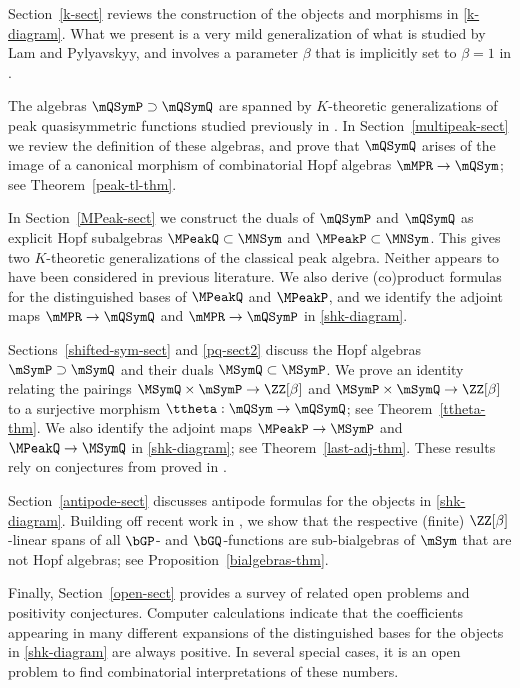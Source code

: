   Section~\ref{k-sect} reviews the construction of the objects and morphisms
in \eqref{k-diagram}. What we present is a very mild generalization of what is studied
by Lam and Pylyavskyy, and involves a parameter $\beta$ that is implicitly set to $\beta=1$ in \cite{LamPyl}.


 The algebras $\mQSymP\supset \mQSymQ$ are spanned by $K$-theoretic generalizations of 
peak quasisymmetric functions studied previously in \cite{LM2019}.
In Section~\ref{multipeak-sect}
we review the definition of these algebras, and prove that $\mQSymQ$ arises of the image of
a canonical morphism of combinatorial Hopf algebras $\mMPR \to \mQSym$; see Theorem~\ref{peak-tl-thm}.

  In Section~\ref{MPeak-sect} we construct the duals of 
$\mQSymP$ and $\mQSymQ$ as   explicit Hopf subalgebras  $\MPeakQ\subset \MNSym$ and $\MPeakP\subset \MNSym$.
This gives two $K$-theoretic generalizations of the classical peak algebra.
Neither appears to have been considered 
in previous literature.
We also derive (co)product formulas for the distinguished bases of 
 $\MPeakQ$ and $\MPeakP$,
 and we identify the adjoint maps $\mMPR \to \mQSymQ$ and $\mMPR \to \mQSymP$ in \eqref{shk-diagram}.
 
  Sections~\ref{shifted-sym-sect} and \ref{pq-sect2}
 discuss the Hopf algebras $\mSymP\supset \mSymQ$
 and their duals $\MSymQ\subset \MSymP$. We 
 prove an identity relating the pairings  $\MSymQ\times \mSymP \to \ZZ[\beta]$
and $\MSymP\times \mSymQ \to \ZZ[\beta]$ to a surjective morphism $\ttheta : \mQSym \to \mQSymQ$;
see Theorem~\ref{ttheta-thm}.
We also identify the adjoint maps $\MPeakP \to \MSymP$
and $\MPeakQ \to \MSymQ$ in \eqref{shk-diagram}; see Theorem~\ref{last-adj-thm}.
These results rely on conjectures from \cite{LM2019,NN2018} proved in \cite{ChiuMarberg,LM2022}.

  Section~\ref{antipode-sect} discusses antipode formulas for the objects in \eqref{shk-diagram}. Building off recent work in \cite{LM2022}, we show that the respective (finite) $\ZZ[\beta]$-linear
spans of all $\bGP$- and $\bGQ$-functions are   sub-bialgebras of $\mSym$ that are not Hopf algebras; see Proposition~\ref{bialgebras-thm}.


  Finally, Section~\ref{open-sect} provides a survey of related open problems and positivity conjectures.
Computer calculations indicate that the coefficients appearing in many different expansions of the distinguished 
bases for the objects in \eqref{shk-diagram} are always positive. In several special cases, it is an open problem to find combinatorial
interpretations of these numbers.
 
